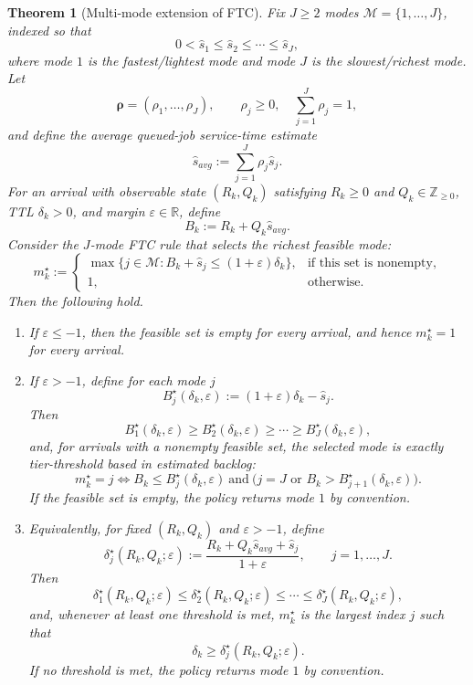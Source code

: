 \documentclass[preprint,12pt]{elsarticle}
\newtheorem{theorem}{Theorem}[section]
\begin{document}
\begin{theorem}[Multi-mode extension of FTC]
\label{thm:ftc_multimode}
Fix $J \ge 2$ modes $\mathcal{M}=\{1,\dots,J\}$, indexed so that
\[
0 < \hat{s}_1 \le \hat{s}_2 \le \cdots \le \hat{s}_J,
\]
where mode $1$ is the fastest/lightest mode and mode $J$ is the
slowest/richest mode. Let
\[
\boldsymbol{\rho}=(\rho_1,\dots,\rho_J), \qquad \rho_j \ge 0,\quad
\sum_{j=1}^J \rho_j = 1,
\]
and define the average queued-job service-time estimate
\[
\hat{s}_{avg} := \sum_{j=1}^J \rho_j \hat{s}_j.
\]
For an arrival with observable state $(R_k,Q_k)$ satisfying $R_k \ge 0$ and
$Q_k \in \mathbb{Z}_{\ge 0}$, TTL $\delta_k > 0$, and margin $\varepsilon \in \mathbb{R}$, define
\[
B_k := R_k + Q_k \hat{s}_{avg}.
\]
Consider the $J$-mode FTC rule that selects the richest feasible mode:
\[
m_k^\star :=
\begin{cases}
\max\{j \in \mathcal{M} : B_k + \hat{s}_j \le (1+\varepsilon)\delta_k\},
& \text{if this set is nonempty},\\[1mm]
1, & \text{otherwise}.
\end{cases}
\]
Then the following hold.

\begin{enumerate}
\item If $\varepsilon \le -1$, then the feasible set is empty for every arrival,
and hence $m_k^\star = 1$ for every arrival.

\item If $\varepsilon > -1$, define for each mode $j$
\[
B_j^\star(\delta_k,\varepsilon) := (1+\varepsilon)\delta_k - \hat{s}_j.
\]
Then
\[
B_1^\star(\delta_k,\varepsilon) \ge B_2^\star(\delta_k,\varepsilon) \ge \cdots
\ge B_J^\star(\delta_k,\varepsilon),
\]
and, for arrivals with a nonempty feasible set, the selected mode is exactly
tier-threshold based in estimated backlog:
\[
m_k^\star = j
\iff
B_k \le B_j^\star(\delta_k,\varepsilon)
\ \text{and}\
\bigl(j=J \text{ or } B_k > B_{j+1}^\star(\delta_k,\varepsilon)\bigr).
\]
If the feasible set is empty, the policy returns mode $1$ by convention.

\item Equivalently, for fixed $(R_k,Q_k)$ and $\varepsilon > -1$, define
\[
\delta_j^\star(R_k,Q_k;\varepsilon)
:=
\frac{R_k + Q_k \hat{s}_{avg} + \hat{s}_j}{1+\varepsilon},
\qquad j=1,\dots,J.
\]
Then
\[
\delta_1^\star(R_k,Q_k;\varepsilon)
\le
\delta_2^\star(R_k,Q_k;\varepsilon)
\le \cdots \le
\delta_J^\star(R_k,Q_k;\varepsilon),
\]
and, whenever at least one threshold is met, $m_k^\star$ is the largest index
$j$ such that
\[
\delta_k \ge \delta_j^\star(R_k,Q_k;\varepsilon).
\]
If no threshold is met, the policy returns mode $1$ by convention.


\end{enumerate}
\end{theorem}
\end{document}
